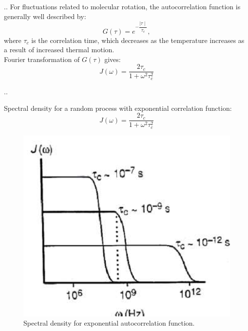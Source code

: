 \documentclass[handout]{beamer}
\begin{document}
\begin{frame}{\thesection.\thesubsection. \insertsubsection}
	For fluctuations related to molecular rotation, the autocorrelation function is generally well described by:
	\begin{equation}
	G(\tau) = e^{- \dfrac{\mid \tau \mid}{\tau_c}},
	\end{equation}
	where $\tau_c$ is the correlation time, which decreases as the temperature increases as a result of increased thermal motion. \\
	Fourier transformation of $G(\tau)$ gives:
	\begin{equation}
	 J(\omega) = \dfrac{2 \tau_c}{1 + \omega^2 \tau_c^2}
	\end{equation}
	
\end{frame}

\begin{frame}{\thesection.\thesubsection. \insertsubsection}

	Spectral density for a random process with exponential correlation function:
	\begin{equation*}
     	J(\omega) = \dfrac{2 \tau_c}{1 + \omega^2 \tau_c^2}
	\end{equation*}
	\begin{figure}
	\centering
	\includegraphics[scale=0.3]{figures/spectral_density.png}
	\caption{Spectral density for exponential autocorrelation function.}
    \end{figure}

\end{frame}
\end{document}
